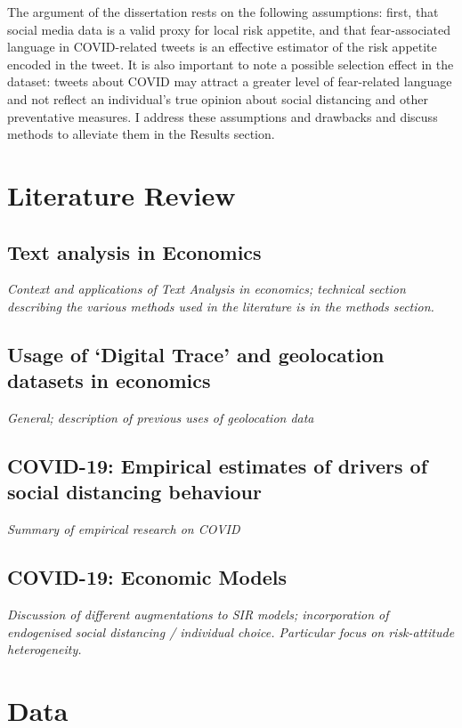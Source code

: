 \documentclass{article}
\begin{document}
The argument of the dissertation rests on the following assumptions: first, that social media data is a valid proxy for local risk appetite, and that fear-associated language in COVID-related tweets is an effective estimator of the risk appetite encoded in the tweet. It is also important to note a possible selection effect in the dataset: tweets about COVID may attract a greater level of fear-related language and not reflect an individual's true opinion about social distancing and other preventative measures. I address these assumptions and drawbacks and discuss methods to alleviate them in the Results section.


\section{Literature Review}%
\subsection{Text analysis in Economics}
\textit{Context and applications of Text Analysis in economics; technical section describing the various methods used in the literature is in the methods section.}
\subsection{Usage of `Digital Trace' and geolocation datasets in economics}
\textit{General; description of previous uses of geolocation data}
\subsection{COVID-19: Empirical estimates of drivers of social distancing behaviour}
\textit{Summary of empirical research on COVID}
\subsection{COVID-19: Economic Models}
\textit{Discussion of different augmentations to SIR models; incorporation of endogenised social distancing / individual choice. Particular focus on risk-attitude heterogeneity.}
\section{Data} %
\end{document}
